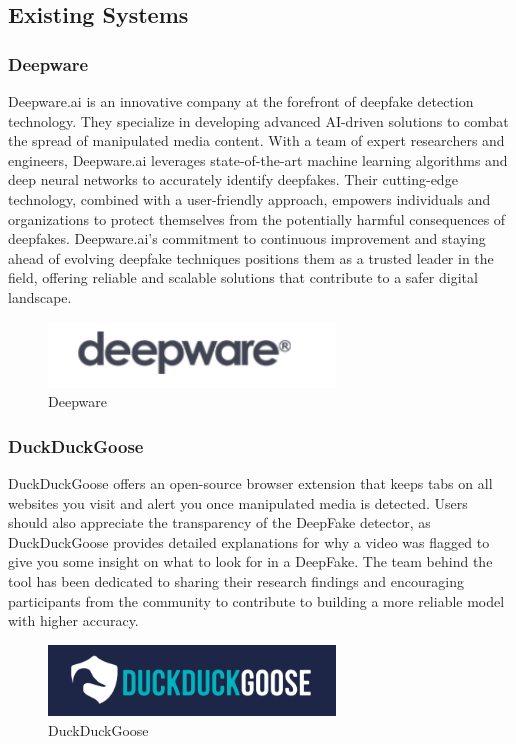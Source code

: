 \subsection{Existing Systems}
\subsubsection{Deepware}
Deepware.ai is an innovative company at the forefront of deepfake detection technology. They specialize in developing advanced AI-driven solutions to combat the spread of manipulated media content. With a team of expert researchers and engineers, Deepware.ai leverages state-of-the-art machine learning algorithms and deep neural networks to accurately identify deepfakes. Their cutting-edge technology, combined with a user-friendly approach, empowers individuals and organizations to protect themselves from the potentially harmful consequences of deepfakes. Deepware.ai's commitment to continuous improvement and staying ahead of evolving deepfake techniques positions them as a trusted leader in the field, offering reliable and scalable solutions that contribute to a safer digital landscape.
\begin{figure}[h]
    \centering
    \includegraphics[width= 3in ]{img/deepware.png}
    \caption{Deepware}
\end{figure}
\subsubsection{DuckDuckGoose}
\justify
DuckDuckGoose offers an open-source browser extension that keeps tabs on all websites you visit and alert you once manipulated media is detected.
Users should also appreciate the transparency of the DeepFake detector, as DuckDuckGoose provides detailed explanations for why a video was flagged to give you some insight on what to look for in a DeepFake.
The team behind the tool has been dedicated to sharing their research findings and encouraging participants from the community to contribute to building a more reliable model with higher accuracy.
\begin{figure}[h]
    \centering
    \includegraphics[width= 3in ]{img/duckduckgoose.png}
    \caption{DuckDuckGoose}
\end{figure}
\newpage